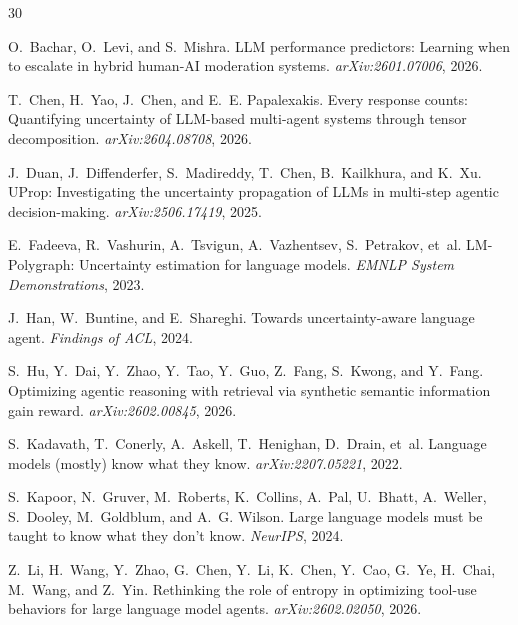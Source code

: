 \documentclass{article}
\begin{document}

\begin{thebibliography}{30}

O.~Bachar, O.~Levi, and S.~Mishra.
\newblock LLM performance predictors: Learning when to escalate in hybrid
human-AI moderation systems.
\newblock \emph{arXiv:2601.07006}, 2026.

T.~Chen, H.~Yao, J.~Chen, and E.~E. Papalexakis.
\newblock Every response counts: Quantifying uncertainty of LLM-based
multi-agent systems through tensor decomposition.
\newblock \emph{arXiv:2604.08708}, 2026.

J.~Duan, J.~Diffenderfer, S.~Madireddy, T.~Chen, B.~Kailkhura, and K.~Xu.
\newblock UProp: Investigating the uncertainty propagation of LLMs in
multi-step agentic decision-making.
\newblock \emph{arXiv:2506.17419}, 2025.

E.~Fadeeva, R.~Vashurin, A.~Tsvigun, A.~Vazhentsev, S.~Petrakov, et~al.
\newblock LM-Polygraph: Uncertainty estimation for language models.
\newblock \emph{EMNLP System Demonstrations}, 2023.

J.~Han, W.~Buntine, and E.~Shareghi.
\newblock Towards uncertainty-aware language agent.
\newblock \emph{Findings of ACL}, 2024.

S.~Hu, Y.~Dai, Y.~Zhao, Y.~Tao, Y.~Guo, Z.~Fang, S.~Kwong, and Y.~Fang.
\newblock Optimizing agentic reasoning with retrieval via synthetic semantic
information gain reward.
\newblock \emph{arXiv:2602.00845}, 2026.

S.~Kadavath, T.~Conerly, A.~Askell, T.~Henighan, D.~Drain, et~al.
\newblock Language models (mostly) know what they know.
\newblock \emph{arXiv:2207.05221}, 2022.

S.~Kapoor, N.~Gruver, M.~Roberts, K.~Collins, A.~Pal, U.~Bhatt,
A.~Weller, S.~Dooley, M.~Goldblum, and A.~G. Wilson.
\newblock Large language models must be taught to know what they don't know.
\newblock \emph{NeurIPS}, 2024.

Z.~Li, H.~Wang, Y.~Zhao, G.~Chen, Y.~Li, K.~Chen, Y.~Cao, G.~Ye, H.~Chai,
M.~Wang, and Z.~Yin.
\newblock Rethinking the role of entropy in optimizing tool-use behaviors for
large language model agents.
\newblock \emph{arXiv:2602.02050}, 2026.


\end{thebibliography}
\end{document}
